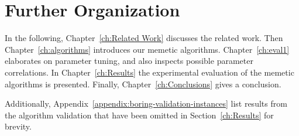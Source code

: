 \documentclass[thesis.tex]{subfiles}
\begin{document}
\section{Further Organization}
   \label{sec:Further Organization}
%
   In the following, Chapter~\ref{ch:Related Work} discusses the related work. Then Chapter~\ref{ch:algorithms} introduces our memetic algorithms. Chapter~\ref{ch:eval1} elaborates on parameter tuning, and also inspects possible parameter correlations. In Chapter~\ref{ch:Results} the experimental evaluation of the memetic algorithms is presented. Finally, Chapter~\ref{ch:Conclusions} gives a conclusion.
   
   Additionally, Appendix~\ref{appendix:boring-validation-instances} list results from the algorithm validation that have been omitted in Section~\ref{ch:Results} for brevity.
\end{document}
